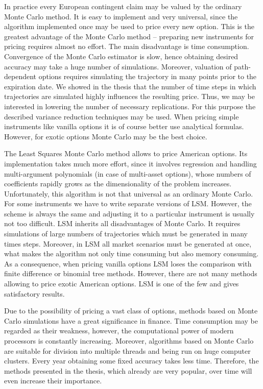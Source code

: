 \documentclass[a4paper,11pt, twoside]{book}
\theoremstyle{definition}
\theoremstyle{remark}
\begin{document}
In practice every European contingent claim may be valued by the ordinary Monte Carlo method. It is easy to implement and very universal, since the algorithm implemented once may be used to price every new option. This is the greatest advantage of the Monte Carlo method -- preparing new instruments for pricing requires almost no effort. The main disadvantage is time consumption. Convergence of the Monte Carlo estimator is slow, hence obtaining desired accuracy may take a huge number of simulations. Moreover, valuation of path-dependent options requires simulating the trajectory in many points prior to the expiration date. We showed in the thesis that the number of time steps in which trajectories are simulated highly influences  the resulting price. Thus, we may be interested in lowering the number of necessary replications. For this purpose the described variance reduction techniques may be used. When pricing simple instruments like vanilla options it is of course better use analytical formulas. However, for exotic options Monte Carlo may be the best choice.


The Least Squares Monte Carlo method allows to price American options. Its implementation takes much more effort, since it involves regression and handling multi-argument polynomials (in case of multi-asset options), whose numbers of coefficients rapidly grows as the dimensionality of the problem increases. Unfortunately, this algorithm is not that universal as an ordinary Monte Carlo. For some instruments we have to write separate versions of LSM. However, the scheme is always the same and adjusting it to a particular instrument is usually not too difficult. LSM inherits all disadvantages of Monte Carlo. It requires simulations of large numbers of trajectories which must be generated in many times steps. Moreover, in LSM all market scenarios must be generated at once, what makes the algorithm not only time consuming but also memory consuming. As a consequence, when pricing vanilla options LSM loses the comparison with finite difference or binomial tree methods. However, there are not many methods allowing to price exotic American options. LSM is one of the few and gives satisfactory results.


Due to the possibility of pricing a vast class of options, methods based on Monte Carlo simulations have a great significance in finance. Time consumption may be regarded as their weakness, however, the computational power of modern processors is constantly increasing. Moreover, algorithms based on Monte Carlo are suitable for division into multiple threads and being run on huge computer clusters. Every year obtaining some fixed accuracy takes less time. Therefore, the methods presented in the thesis, which already are very popular, over time will even increase their importance.
\end{document}
